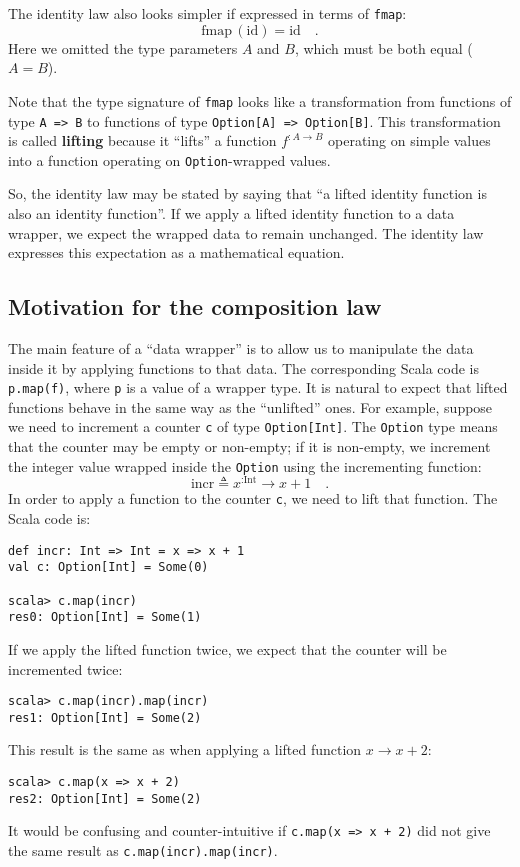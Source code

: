 The identity law also looks simpler if expressed in terms of \lstinline!fmap!:
\[
\text{fmap}\,(\text{id})=\text{id}\quad.
\]
Here we omitted the type parameters $A$ and $B$, which must be both
equal ($A=B$).

Note that the type signature of \lstinline!fmap! looks like a transformation
from functions of type \lstinline!A => B! to functions of type \lstinline!Option[A] => Option[B]!.
This transformation is called \textbf{lifting} because
it \textsf{``}lifts\textsf{''} a function $f^{:A\rightarrow B}$ operating on simple
values into a function operating on \lstinline!Option!-wrapped values. 

So, the identity law may be stated by saying that \textsf{``}a lifted identity
function is also an identity function\textsf{''}. If we apply a lifted identity
function to a data wrapper, we expect the wrapped data to remain unchanged.
The identity law expresses this expectation as a mathematical equation.

\subsection{Motivation for the composition law}

The main feature of a \textsf{``}data wrapper\textsf{''} is to allow us to manipulate
the data inside it by applying functions to that data. The corresponding
Scala code is \lstinline!p.map(f)!, where \lstinline!p! is a value
of a wrapper type. It is natural to expect that lifted functions behave
in the same way as the \textsf{``}unlifted\textsf{''} ones. For example, suppose we
need to increment a counter \lstinline!c! of type \lstinline!Option[Int]!.
The \lstinline!Option! type means that the counter may be empty or
non-empty; if it is non-empty, we increment the integer value wrapped
inside the \lstinline!Option! using the incrementing function:
\[
\text{incr}\triangleq x^{:\text{Int}}\rightarrow x+1\quad.
\]
In order to apply a function to the counter \lstinline!c!, we need
to lift that function. The Scala code is:
\begin{lstlisting}
def incr: Int => Int = x => x + 1
val c: Option[Int] = Some(0)

scala> c.map(incr)
res0: Option[Int] = Some(1) 
\end{lstlisting}
If we apply the lifted function twice, we expect that the counter
will be incremented twice:
\begin{lstlisting}
scala> c.map(incr).map(incr)
res1: Option[Int] = Some(2)
\end{lstlisting}
This result is the same as when applying a lifted function $x\rightarrow x+2$:
\begin{lstlisting}
scala> c.map(x => x + 2)
res2: Option[Int] = Some(2)
\end{lstlisting}
It would be confusing and counter-intuitive if \lstinline!c.map(x => x + 2)!
did not give the same result as \lstinline!c.map(incr).map(incr)!. 

